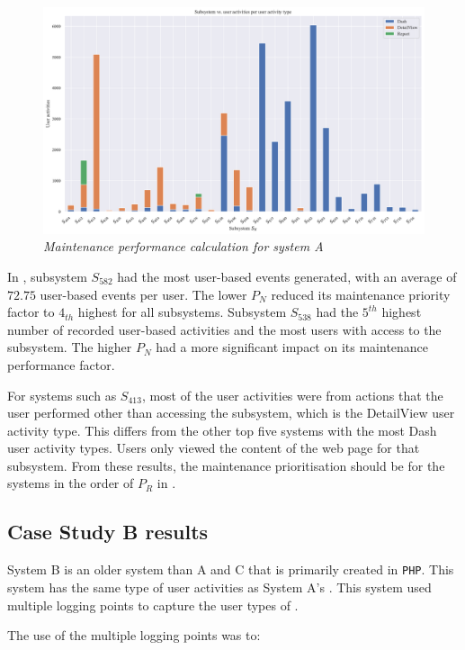 \begin{figure}[!htb]
	\centering %
	\includegraphics[width=0.95\linewidth]{img/ch3/analysis/case_A_subsystems_1.pdf}
	\caption[Maintenance performance calculation for system A]
	{\textit{Maintenance performance calculation for system A}}\label{fig:ch3_caseAAnalysis}
\end{figure}

\par In , subsystem $S_{582}$ had the most user-based events generated, with an average of $72.75$ user-based events per user. The lower $P_N$ reduced its maintenance priority factor to $4_{th}$ highest for all subsystems. Subsystem $S_{538}$ had the $5^{th}$ highest number of recorded user-based activities and the most users with access to the subsystem. The higher $P_N$ had a more significant impact on its maintenance performance factor.\par For systems such as $S_{413}$, most of the user activities were from actions that the user performed other than accessing the subsystem, which is the DetailView user activity type. This differs from the other top five systems with the most Dash user activity types. Users only viewed the content of the web page for that subsystem. From these results, the maintenance prioritisation should be for the systems in the order of $P_R$ in . 

\subsection{Case Study B results}\label{sec:ch3_csB}
System B is an older system than A and C that is primarily created in \texttt{PHP}. This system has the same type of user activities as System A's . This system used multiple logging points to capture the user types of .\par The use of the multiple logging points was to:

